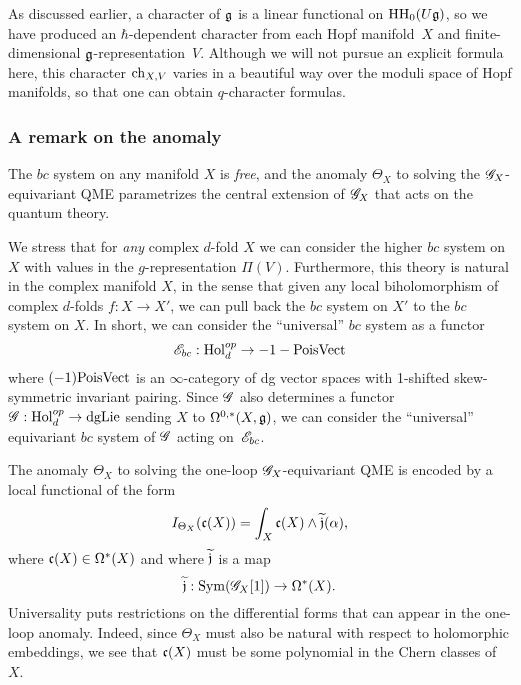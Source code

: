 As discussed earlier, a character of $\mathfrak g$ is a linear functional on ${\rm HH}_0(U \mathfrak g)$,
so we have produced an $\hbar$-dependent character from each Hopf manifold~$X$ and finite-dimensional $\mathfrak g$-representation~$V$.
Although we will not pursue an explicit formula here, 
this character ${\rm ch}_{X,V}$ varies in a beautiful way over the moduli space of Hopf manifolds,
so that one can obtain $q$-character formulas.


\subsubsection{A remark on the anomaly}\label{sec: hopfobs}

The $bc$ system on any manifold $X$ is {\em free}, and the anomaly $\Theta_X$ to solving the $\mathscr G_X$-equivariant QME parametrizes the central extension of $\mathscr G_X$ that acts on the quantum theory.


We stress that for {\em any} complex $d$-fold $X$ we can consider the higher $bc$ system on $X$ with values in the $g$-representation $\Pi(V)$. 
Furthermore, this theory is natural in the complex manifold $X$, in the sense that given any local biholomorphism of complex $d$-folds $f : X \to X'$, 
we can pull back the $bc$ system on $X'$ to the $bc$ system on $X$. 
In short, we can consider the ``universal'' $bc$ system as a functor
\[
\mathscr E_{bc} : {\rm Hol}_d^{op} \to -1-{\rm PoisVect}
\]
where $(-1){\rm PoisVect}$ is an $\infty$-category of dg vector spaces with 1-shifted skew-symmetric invariant pairing. 
Since $\mathscr G$ also determines a functor $\mathscr G: {\rm Hol}_d^{op} \to {\rm dgLie}$ sending $X$ to $\Omega^{0,*}(X, \mathfrak g)$, we can consider the ``universal'' equivariant $bc$ system of $\mathscr G$ acting on~$\mathscr E_{bc}$. 

The anomaly $\Theta_X$ to solving the one-loop $\mathscr G_X$-equivariant QME is encoded by a local functional of the form
\[
I_{\Theta_X}(\mathfrak c(X))=\int_X \mathfrak c(X) \wedge \widetilde{\mathfrak j}(\alpha),
\]
where $\mathfrak c(X) \in \Omega^*(X)$ and where $\widetilde{\mathfrak j}$ is a map
\[
\widetilde{\mathfrak j} : {\rm Sym}(\mathscr G_X[1]) \to \Omega^*(X) .
\]
Universality puts restrictions on the differential forms that can appear in the one-loop anomaly. 
Indeed, since $\Theta_X$ must also be natural with respect to holomorphic embeddings, we see that $\mathfrak c(X)$ must be some polynomial in the Chern classes of~$X$. 

